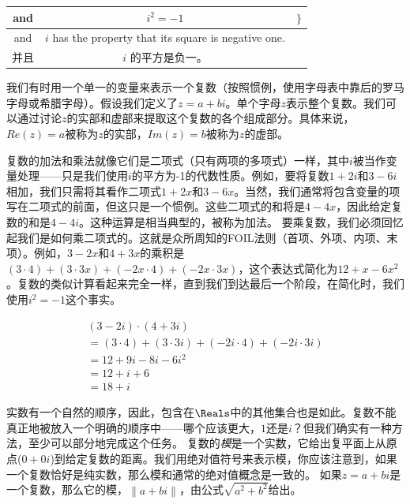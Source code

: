 \vspace{.2in}

\begin{tabular}{c|c|c}
  \rule[-10pt]{0pt}{22pt} and & $i^2 = -1$                    & $\}$ \\ \hline
  \rule[-6pt]{0pt}{22pt} and  & $i$ has the property that its
  square is negative one.     &                                      \\
  \rule[-6pt]{0pt}{22pt} 并且 & $i$ 的平方是负一。            &      \\
\end{tabular}

\vspace{.2in}

我们有时用一个单一的变量来表示一个复数（按照惯例，使用字母表中靠后的罗马字母或希腊字母）。假设我们定义了$z = a + bi$。单个字母$z$表示整个复数。我们可以通过讨论$z$的实部和虚部来提取这个复数的各个组成部分。具体来说，$Re(z) = a$被称为$z$的实部，$Im(z) = b$被称为$z$的虚部。

复数的加法和乘法就像它们是二项式（只有两项的多项式）一样，其中$i$被当作变量处理——只是我们使用$i$的平方为-1的代数性质。例如，要将复数$1+2i$和$3-6i$相加，我们只需将其看作二项式$1+2x$和$3-6x$。当然，我们通常将包含变量的项写在二项式的前面，但这只是一个惯例。这些二项式的和将是$4-4x$，因此给定复数的和是$4-4i$。这种运算是相当典型的，被称为加法。
要乘复数，我们必须回忆起我们是如何乘二项式的。这就是众所周知的FOIL法则（首项、外项、内项、末项）。例如，$3-2x$和$4+3x$的乘积是$(3\cdot 4) + (3 \cdot 3x) + (-2x\cdot 4) + (-2x\cdot 3x)$，这个表达式简化为$12 + x - 6x^2$。复数的类似计算看起来完全一样，直到我们到达最后一个阶段，在简化时，我们使用$i^2=-1$这个事实。

\begin{gather*}
  (3-2i)\cdot (4+3i) \\
  = (3\cdot 4) + (3\cdot 3i) + (-2i\cdot 4) + (-2i\cdot 3i) \\
  = 12 + 9i - 8i -6i^2 \\
  = 12 + i + 6 \\
  = 18 + i
\end{gather*}

实数有一个自然的顺序，因此，包含在$\Reals$中的其他集合也是如此。复数不能真正地被放入一个明确的顺序中——哪个应该更大，$1$还是$i$？但我们确实有一种方法，至少可以部分地完成这个任务。
复数的\emph{模}是一个实数，它给出复平面上从原点($0+0i$)到给定复数的距离。我们用绝对值符号来表示模，你应该注意到，如果一个复数恰好是纯实数，那么模和通常的绝对值概念是一致的。
如果$z = a + bi$是一个复数，那么它的模，$\|a + bi \|$，由公式$\sqrt{a^2+b^2}$给出。

